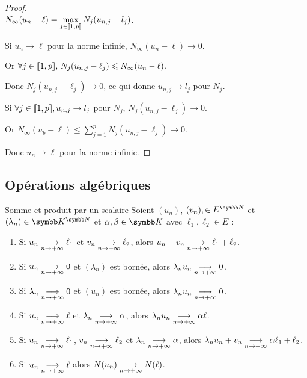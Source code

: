 \begin{proof}~\\
    $\displaystyle N_\infty(u_n - \ell) = \max_{j \in [\![1, p]\!]} N_j(u_{n, j} - l_j)$.

    Si $u_n \to \ell$ pour la norme infinie, $N_\infty(u_n - \ell) \to 0$.

    Or $\forall j \in [\![1, p]\!], \, N_j(u_{n, j}- \ell_j) \leqslant N_\infty(u_n - \ell)$.

    Donc $N_j(u_{n, j} - \ell_j) \to 0$,
    ce qui donne $u_{n, j} \to l_j$ pour $N_j$.

    Si $\forall j \in [\![1, p]\!], u_{n, j} \to l_j$ pour $N_j$, $N_j(u_{n, j} - \ell_j) \to 0$.

    Or $\displaystyle N_\infty(u_b - \ell) \leqslant \sum_{j = 1}^{p } N_j(u_{n, j} - \ell_j) \to 0$.

    Donc $u_n \to \ell$ pour la norme infinie. 
\end{proof}

\subsection{Opérations algébriques}

\begin{proposition}{Somme et produit par un scalaire}{}
    Soient $(u_n)$, $(v_n), \in E^{\N}$ et $(\lambda_n) \in \K^{\N}$ 
    et $\alpha, \beta \in \K$ avec $\ell_1, \ell_2 \in E$ :

    \begin{enumerate}
        \item Si $u_n \underset{n \to +\infty}{\longrightarrow} \ell_1$ et $v_n \underset{n \to +\infty}{\longrightarrow} \ell_2$, alors 
            $u_n + v_n \underset{n \to +\infty}{\longrightarrow} \ell_1 + \ell_2$.
        \item Si $u_n \underset{n \to +\infty}{\longrightarrow} 0$ et $(\lambda_n)$ est bornée,
            alors $\lambda_n u_n \underset{n \to +\infty}{\longrightarrow} 0$.
        \item Si $\lambda_n \underset{n \to +\infty}{\longrightarrow} 0$ et $(u_n)$ est bornée, 
            alors $\lambda_n u_n \underset{n \to +\infty}{\longrightarrow} 0$.
        \item Si $u_n \underset{n \to +\infty}{\longrightarrow} \ell$ et $\lambda_n \underset{n \to +\infty}{\longrightarrow} \alpha$, alors
            $\lambda_n u_n \underset{n \to +\infty}{\longrightarrow} \alpha \ell$.
        \item Si $u_n \underset{n \to +\infty}{\longrightarrow} \ell_1$, $v_n \underset{n \to +\infty}{\longrightarrow} \ell_2$ 
            et $\lambda_n \underset{n \to +\infty}{\longrightarrow} \alpha$, alors
            $\lambda_n u_n + v_n \underset{n \to +\infty}{\longrightarrow} \alpha \ell_1 + \ell_2$.
        \item Si $u_n \underset{n \to +\infty}{\longrightarrow} \ell$ alors $N(u_n) \underset{n \to +\infty}{\longrightarrow} N(\ell)$.
    \end{enumerate}
\end{proposition}

